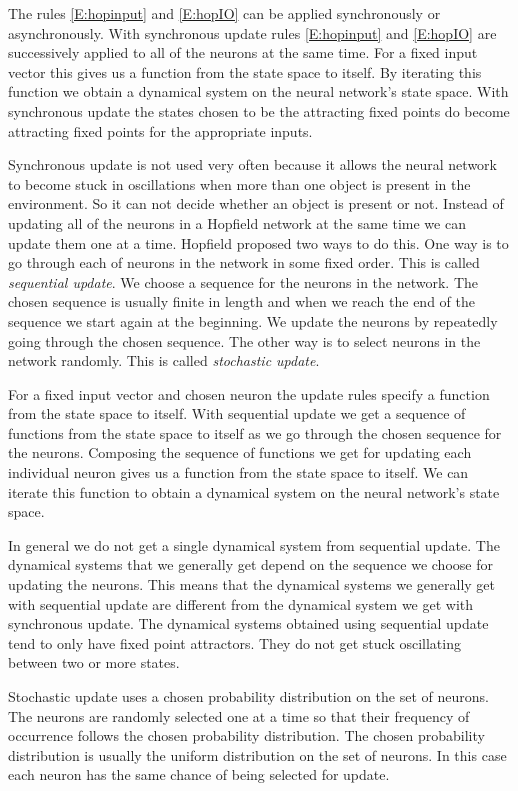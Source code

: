    The rules \eqref{E:hopinput} and \eqref{E:hopIO} can be applied synchronously
or asynchronously.  With synchronous update rules \eqref{E:hopinput} and 
\eqref{E:hopIO} are successively applied to all of the neurons at the same 
time.  For a fixed input vector this gives us a function from the state space 
to itself.  By iterating this function we obtain a dynamical system on the 
neural network's state space.  With synchronous update the states chosen to be
the attracting fixed points do become attracting fixed points for the 
appropriate inputs.

   Synchronous update is not used very often because it allows the neural
network to become stuck in oscillations when more than one object is present 
in the environment.  So it can not decide whether an object is present or not.
Instead of updating all of the neurons in a Hopfield network at the same time 
we can update them one at a time.  Hopfield proposed two ways to do this.  One 
way is to go through each of neurons in the network in some fixed order.  This 
is called \emph{sequential update}.  We choose a sequence for the neurons in 
the network.  The chosen sequence is usually finite in length and when we reach 
the end of the sequence we start again at the beginning.  We update the neurons 
by repeatedly going through the chosen sequence.  The other way is to select 
neurons in the network randomly.  This is called \emph{stochastic update}.

   For a fixed input vector and chosen neuron the update rules specify a 
function from the state space to itself.  With sequential update we get a 
sequence of functions from the state space to itself as we go through the 
chosen sequence for the neurons.  Composing the sequence of functions we get 
for updating each individual neuron gives us a function from the state space to 
itself.  We can iterate this function to obtain a dynamical system on the 
neural network's state space.

   In general we do not get a single dynamical system from sequential update.
The dynamical systems that we generally get depend on the sequence we choose
for updating the neurons.  This means that the dynamical systems we generally
get with sequential update are different from the dynamical system we get with
synchronous update.  The dynamical systems obtained using sequential update 
tend to only have fixed point attractors.  They do not get stuck oscillating 
between two or more states.

   Stochastic update uses a chosen probability distribution on the set of 
neurons.  The neurons are randomly selected one at a time so that their 
frequency of occurrence follows the chosen probability distribution.  The
chosen probability distribution is usually the uniform distribution on the 
set of neurons.  In this case each neuron has the same chance of being selected
for update. 

